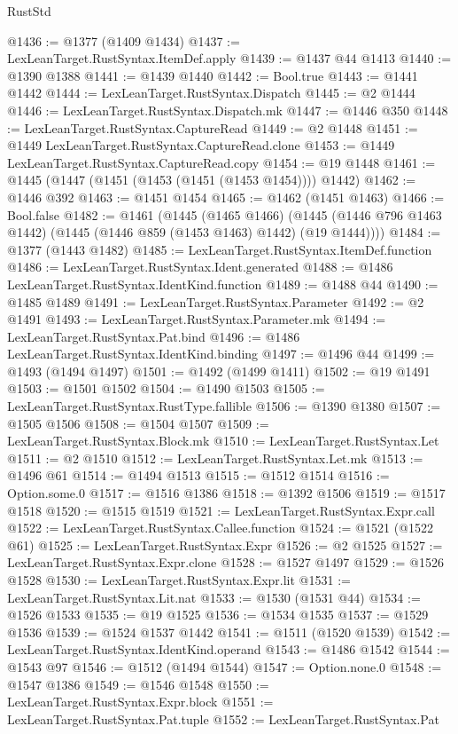 \begin{lexlean}{RustStd}
\begin{coremodule}
{{@1436 := @1377 (@1409 @1434)
@1437 := LexLeanTarget.RustSyntax.ItemDef.apply
@1439 := @1437 @44 @1413
@1440 := @1390 @1388
@1441 := @1439 @1440
@1442 := Bool.true
@1443 := @1441 @1442
@1444 := LexLeanTarget.RustSyntax.Dispatch
@1445 := @2 @1444
@1446 := LexLeanTarget.RustSyntax.Dispatch.mk
@1447 := @1446 @350
@1448 := LexLeanTarget.RustSyntax.CaptureRead
@1449 := @2 @1448
@1451 := @1449 LexLeanTarget.RustSyntax.CaptureRead.clone
@1453 := @1449 LexLeanTarget.RustSyntax.CaptureRead.copy
@1454 := @19 @1448
@1461 := @1445 (@1447 (@1451 (@1453 (@1451 (@1453 @1454)))) @1442)
@1462 := @1446 @392
@1463 := @1451 @1454
@1465 := @1462 (@1451 @1463)
@1466 := Bool.false
@1482 := @1461
    (@1445
      (@1465 @1466)
      (@1445 (@1446 @796 @1463 @1442) (@1445 (@1446 @859 (@1453 @1463) @1442) (@19 @1444))))
@1484 := @1377 (@1443 @1482)
@1485 := LexLeanTarget.RustSyntax.ItemDef.function
@1486 := LexLeanTarget.RustSyntax.Ident.generated
@1488 := @1486 LexLeanTarget.RustSyntax.IdentKind.function
@1489 := @1488 @44
@1490 := @1485 @1489
@1491 := LexLeanTarget.RustSyntax.Parameter
@1492 := @2 @1491
@1493 := LexLeanTarget.RustSyntax.Parameter.mk
@1494 := LexLeanTarget.RustSyntax.Pat.bind
@1496 := @1486 LexLeanTarget.RustSyntax.IdentKind.binding
@1497 := @1496 @44
@1499 := @1493 (@1494 @1497)
@1501 := @1492 (@1499 @1411)
@1502 := @19 @1491
@1503 := @1501 @1502
@1504 := @1490 @1503
@1505 := LexLeanTarget.RustSyntax.RustType.fallible
@1506 := @1390 @1380
@1507 := @1505 @1506
@1508 := @1504 @1507
@1509 := LexLeanTarget.RustSyntax.Block.mk
@1510 := LexLeanTarget.RustSyntax.Let
@1511 := @2 @1510
@1512 := LexLeanTarget.RustSyntax.Let.mk
@1513 := @1496 @61
@1514 := @1494 @1513
@1515 := @1512 @1514
@1516 := Option.some.{0}
@1517 := @1516 @1386
@1518 := @1392 @1506
@1519 := @1517 @1518
@1520 := @1515 @1519
@1521 := LexLeanTarget.RustSyntax.Expr.call
@1522 := LexLeanTarget.RustSyntax.Callee.function
@1524 := @1521 (@1522 @61)
@1525 := LexLeanTarget.RustSyntax.Expr
@1526 := @2 @1525
@1527 := LexLeanTarget.RustSyntax.Expr.clone
@1528 := @1527 @1497
@1529 := @1526 @1528
@1530 := LexLeanTarget.RustSyntax.Expr.lit
@1531 := LexLeanTarget.RustSyntax.Lit.nat
@1533 := @1530 (@1531 @44)
@1534 := @1526 @1533
@1535 := @19 @1525
@1536 := @1534 @1535
@1537 := @1529 @1536
@1539 := @1524 @1537 @1442
@1541 := @1511 (@1520 @1539)
@1542 := LexLeanTarget.RustSyntax.IdentKind.operand
@1543 := @1486 @1542
@1544 := @1543 @97
@1546 := @1512 (@1494 @1544)
@1547 := Option.none.{0}
@1548 := @1547 @1386
@1549 := @1546 @1548
@1550 := LexLeanTarget.RustSyntax.Expr.block
@1551 := LexLeanTarget.RustSyntax.Pat.tuple
@1552 := LexLeanTarget.RustSyntax.Pat
}}
\end{coremodule}
\end{lexlean}
